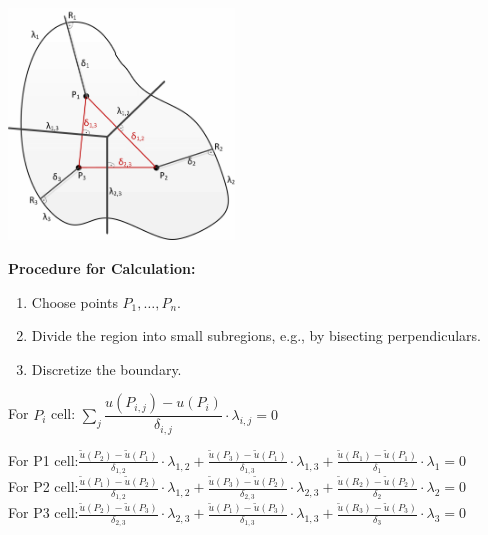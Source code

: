 \begin{minipage}{6cm}
	\includegraphics[width=6cm]{Content/02_numerics/FVM1.png}
\end{minipage}
\hfill
\begin{minipage}{12cm}
\textbf{Procedure for Calculation:}\\
\begin{enumerate}
\item Choose points $P_1,\ldots,P_n$.
\item Divide the region into small subregions, e.g., by bisecting perpendiculars.
\item Discretize the boundary.\\
\end{enumerate}

For $P_i$ cell: $\sum\limits_{j} \dfrac{u(P_{i,j}) - u(P_i)}{\delta_{i,j}} \cdot \lambda_{i,j} = 0$

For P1 cell:\quad $\frac{\tilde{u}(P_2)-\tilde{u}(P_1)}{\delta_{1,2}}\cdot\lambda_{1,2}+\frac{\tilde{u}(P_3)-\tilde{u}(P_1)}{\delta_{1,3}}\cdot\lambda_{1,3}+\frac{\tilde{u}(R_1)-\tilde{u}(P_1)}{\delta_1}\cdot\lambda_1=0$\\

For P2 cell:\quad $\frac{\tilde{u}(P_1)-\tilde{u}(P_2)}{\delta_{1,2}}\cdot\lambda_{1,2}+\frac{\tilde{u}(P_3)-\tilde{u}(P_2)}{\delta_{2,3}}\cdot\lambda_{2,3}+\frac{\tilde{u}(R_2)-\tilde{u}(P_2)}{\delta_2}\cdot\lambda_2=0$\\

For P3 cell:\quad $\frac{\tilde{u}(P_2)-\tilde{u}(P_3)}{\delta_{2,3}}\cdot\lambda_{2,3}+\frac{\tilde{u}(P_1)-\tilde{u}(P_3)}{\delta_{1,3}}\cdot\lambda_{1,3}+\frac{\tilde{u}(R_3)-\tilde{u}(P_3)}{\delta_3}\cdot\lambda_3=0$\\
\end{minipage}

